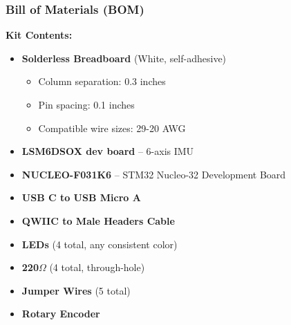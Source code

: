 \documentclass{beamer}
\begin{document}
\begin{frame}
    \frametitle{Bill of Materials (BOM)}
    \textbf{Kit Contents:}
    \begin{itemize}
        \item \textbf{Solderless Breadboard} (White, self-adhesive)
            \begin{itemize}
                \item Column separation: 0.3 inches
                \item Pin spacing: 0.1 inches
                \item Compatible wire sizes: 29-20 AWG
            \end{itemize}
        \item \textbf{LSM6DSOX dev board} – 6-axis IMU
        \item \textbf{NUCLEO-F031K6} – STM32 Nucleo-32 Development Board
        \item \textbf{USB C to USB Micro A}
        \item \textbf{QWIIC to Male Headers Cable}
        \item \textbf{LEDs} (4 total, any consistent color)
        \item \textbf{220$\Omega$} (4 total, through-hole)
        \item \textbf{Jumper Wires} (5 total)
        \item \textbf{Rotary Encoder}
    \end{itemize}
\end{frame}
\end{document}
